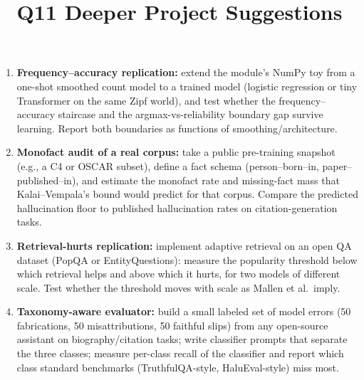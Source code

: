 \documentclass[11pt]{article}
\title{Q11 Deeper Project Suggestions}
\date{}
\begin{document}
\maketitle
\begin{enumerate}[noitemsep]
\item \textbf{Frequency--accuracy replication:} extend the module's NumPy toy from a one-shot smoothed count model to a trained model (logistic regression or tiny Transformer on the same Zipf world), and test whether the frequency--accuracy staircase and the argmax-vs-reliability boundary gap survive learning. Report both boundaries as functions of smoothing/architecture.
\item \textbf{Monofact audit of a real corpus:} take a public pre-training snapshot (e.g., a C4 or OSCAR subset), define a fact schema (person--born--in, paper--published--in), and estimate the monofact rate and missing-fact mass that Kalai--Vempala's bound would predict for that corpus. Compare the predicted hallucination floor to published hallucination rates on citation-generation tasks.
\item \textbf{Retrieval-hurts replication:} implement adaptive retrieval on an open QA dataset (PopQA or EntityQuestions): measure the popularity threshold below which retrieval helps and above which it hurts, for two models of different scale. Test whether the threshold moves with scale as Mallen et al.\ imply.
\item \textbf{Taxonomy-aware evaluator:} build a small labeled set of model errors (50 fabrications, 50 misattributions, 50 faithful slips) from any open-source assistant on biography/citation tasks; write classifier prompts that separate the three classes; measure per-class recall of the classifier and report which class standard benchmarks (TruthfulQA-style, HaluEval-style) miss most.
\end{enumerate}
\end{document}
